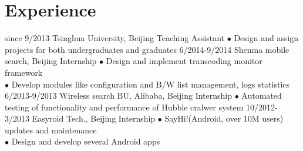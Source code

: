 \documentclass[]{friggeri-cv}
\begin{document}
\section{Experience}

\begin{entrylist}
  \entry
    {since 9/2013}
    {Tsinghua University, Beijing}
    {Teaching Assistant}
    {$\bullet$ Design and assign projects for both undergraduates and graduates}
  \entry
    {6/2014-9/2014}
    {Shenma mobile search, Beijing}
    {Internship}
    {$\bullet$ Design and implement transcoding monitor framework\\
    $\bullet$ Develop modules like configuration and B/W list management, logs statistics}
  \entry
    {6/2013-9/2013}
    {Wireless search BU, Alibaba, Beijing}
    {Internship}
    {$\bullet$ Automated testing of functionality and performance of Hubble cralwer system}
  \entry
    {10/2012-3/2013}
    {Easyroid Tech., Beijing}
    {Internship}
    {$\bullet$ SayHi!(Android, over 10M users) updates and maintenance\\
    $\bullet$ Design and develop several Android apps}
\end{entrylist}
\end{document}
